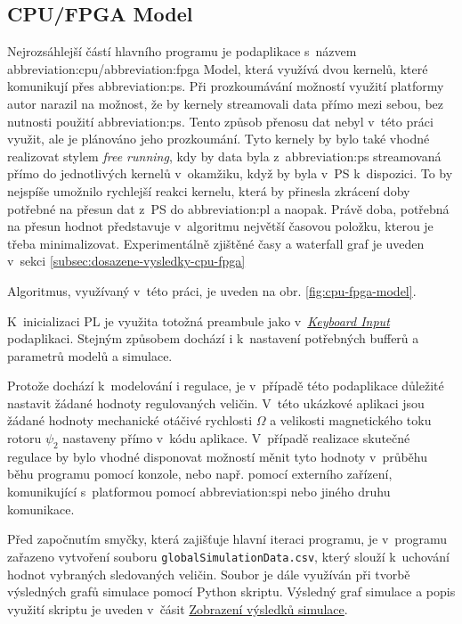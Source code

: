 \documentclass[a4paper, twoside, 11pt]{article}
\begin{document}
		\subsection{CPU/FPGA Model}\label{subsec:cpu-fpga}
			Nejrozsáhlejší částí hlavního programu je podaplikace s~názvem \gls{abbreviation:cpu}/\gls{abbreviation:fpga} Model, která využívá dvou kernelů, které komunikují přes \gls{abbreviation:ps}. Při prozkoumávání možností využití platformy autor narazil na možnost, že by kernely streamovali data přímo mezi sebou, bez nutnosti použití \gls{abbreviation:ps}. Tento způsob přenosu dat nebyl v~této práci využit, ale je plánováno jeho prozkoumání. Tyto kernely by bylo také vhodné realizovat stylem \textit{free running}, kdy by data byla z~\gls{abbreviation:ps} streamovaná přímo do jednotlivých kernelů v~okamžiku, když by byla v~PS k~dispozici. To by nejspíše umožnilo rychlejší reakci kernelu, která by přinesla zkrácení doby potřebné na přesun dat z~PS do \gls{abbreviation:pl} a naopak. Právě doba, potřebná na přesun hodnot představuje v~algoritmu největší časovou položku, kterou je třeba minimalizovat. Experimentálně zjištěné časy a waterfall graf je uveden v~sekci \ref{subsec:dosazene-vysledky-cpu-fpga}\par
			Algoritmus, využívaný v~této práci, je uveden na obr. \ref{fig:cpu-fpga-model}.\par
			K~inicializaci PL je využita totožná preambule jako v~\hyperref[subsec:keyboard-input]{\textit{Keyboard Input}} podaplikaci. Stejným způsobem dochází i k~nastavení potřebných bufferů a parametrů modelů a simulace.\par
			Protože dochází k~modelování i regulace, je v~případě této podaplikace důležité nastavit žádané hodnoty regulovaných veličin. V~této ukázkové aplikaci jsou žádané hodnoty mechanické otáčivé rychlosti $\Omega$ a velikosti magnetického toku rotoru $\psi_2$ nastaveny přímo v~kódu aplikace. V~případě realizace skutečné regulace by bylo vhodné disponovat možností měnit tyto hodnoty v~průběhu běhu programu pomocí konzole, nebo např. pomocí externího zařízení, komunikující s~platformou pomocí \gls{abbreviation:spi} nebo jiného druhu komunikace.\par
			Před započnutím smyčky, která zajišťuje hlavní iteraci programu, je v~programu zařazeno vytvoření souboru \texttt{globalSimulationData.csv}, který slouží k~uchování hodnot vybraných sledovaných veličin. Soubor je dále využíván při tvorbě výsledných grafů simulace pomocí Python skriptu. Výsledný graf simulace a popis využití skriptu je uveden v~čásit \hyperref[subsubsec:zobrazeni-vysledku-simulace]{Zobrazení výsledků simulace}.\par
\end{document}
